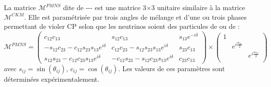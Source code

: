 La matrice $\mathcal{M}^{PMNS}$ dite de --- est une matrice \num{3}$\times$\num{3} unitaire similaire à la matrice $\mathcal{M}^{CKM}$. Elle est paramétrisée par trois angles de mélange et d'une ou trois phases permettant de violer CP selon que les neutrinos soient des particules de  ou de  :
\begin{equation}
\mathcal{M}^{PMNS}= 
\begin{pmatrix} 
c_{12}c_{13} & s_{12}c_{13} & s_{13}e^{-i\delta} \\
-s_{12}c_{23}-c_{12}s_{23}s_{13}e^{i\delta} & c_{12}c_{23}-s_{12}s_{23}s_{13}e^{i\delta} & s_{23}c_{13} \\
s_{12}s_{23}-c_{12}c_{23}s_{13}e^{i\delta} & -c_{12}s_{23}-s_{12}c_{23}s_{13}e^{i\delta} & c_{23}c_{13}
\end{pmatrix}\times \begin{pmatrix}
    1 \\
    & e^{i\frac{\alpha_{21}}{2}} \\
    & & e^{i\frac{\alpha_{31}}{2}} \\
\end{pmatrix}
\end{equation}
avec $s_{ij}=\sin(\theta_{ij})$, $c_{ij}=\cos(\theta_{ij})$.
Les valeurs de ces paramètres sont déterminées expérimentalement.
